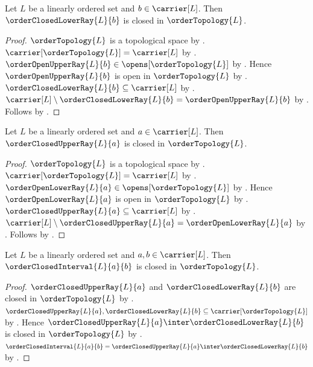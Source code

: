 \begin{theorem}\label{order_closed_lower_ray_is_closed}
    Let $L$ be a linearly ordered set and $b\in\carrier[L]$.
    Then $\orderClosedLowerRay{L}{b}$ is closed in $\orderTopology{L}$.
\end{theorem}
\begin{proof}
    $\orderTopology{L}$ is a topological space by
        .
    $\carrier[\orderTopology{L}]=\carrier[L]$ by
        .
    $\orderOpenUpperRay{L}{b}\in\opens[\orderTopology{L}]$ by
        .
    Hence $\orderOpenUpperRay{L}{b}$ is open in $\orderTopology{L}$ by
        .
    $\orderClosedLowerRay{L}{b}\subseteq\carrier[L]$ by
        .
    $\carrier[L]\setminus\orderClosedLowerRay{L}{b}
        =\orderOpenUpperRay{L}{b}$ by
        .
    Follows by
        .
\end{proof}

\begin{theorem}\label{order_closed_upper_ray_is_closed}
    Let $L$ be a linearly ordered set and $a\in\carrier[L]$.
    Then $\orderClosedUpperRay{L}{a}$ is closed in $\orderTopology{L}$.
\end{theorem}
\begin{proof}
    $\orderTopology{L}$ is a topological space by
        .
    $\carrier[\orderTopology{L}]=\carrier[L]$ by
        .
    $\orderOpenLowerRay{L}{a}\in\opens[\orderTopology{L}]$ by
        .
    Hence $\orderOpenLowerRay{L}{a}$ is open in $\orderTopology{L}$ by
        .
    $\orderClosedUpperRay{L}{a}\subseteq\carrier[L]$ by
        .
    $\carrier[L]\setminus\orderClosedUpperRay{L}{a}
        =\orderOpenLowerRay{L}{a}$ by
        .
    Follows by
        .
\end{proof}

\begin{theorem}\label{order_closed_interval_is_closed}
    Let $L$ be a linearly ordered set and $a,b\in\carrier[L]$.
    Then $\orderClosedInterval{L}{a}{b}$ is closed in
        $\orderTopology{L}$.
\end{theorem}
\begin{proof}
    $\orderClosedUpperRay{L}{a}$ and $\orderClosedLowerRay{L}{b}$ are
        closed in $\orderTopology{L}$ by
        .
    $\orderClosedUpperRay{L}{a},\orderClosedLowerRay{L}{b}
        \subseteq\carrier[\orderTopology{L}]$ by
        .
    Hence $\orderClosedUpperRay{L}{a}\inter
        \orderClosedLowerRay{L}{b}$ is closed in $\orderTopology{L}$ by
        .
    $\orderClosedInterval{L}{a}{b}
        =\orderClosedUpperRay{L}{a}\inter
            \orderClosedLowerRay{L}{b}$ by
        .
\end{proof}
